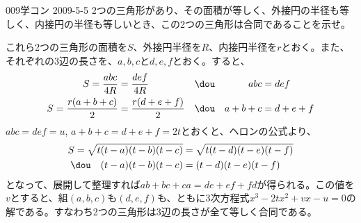 \begin{thm}{009}{}{学コン 2009-5-5}
 2つの三角形があり、その面積が等しく、外接円の半径も等しく、内接円の半径も等しいとき、この2つの三角形は合同であることを示せ。
\end{thm}

これら2つの三角形の面積を$S$、外接円半径を$R$、内接円半径を$r$とおく。また、それぞれの3辺の長さを、$a, b, c$と$d, e, f$とおく。すると、
\begin{align*}
 S=\frac{abc}{4R}&=\frac{def}{4R} & &\dou & abc&=def \\
 S=\frac{r(a+b+c)}{2}&=\frac{r(d+e+f)}{2} & &\dou & a+b+c&=d+e+f
\end{align*}
$abc=def=u$, $a+b+c=d+e+f=2t$とおくと、ヘロンの公式より、
\begin{align*}
 S=\sqrt{t(t-a)(t-b)(t-c)}&=\sqrt{t(t-d)(t-e)(t-f)} \\
 \dou \quad (t-a)(t-b)(t-c)&=(t-d)(t-e)(t-f)
\end{align*}
となって、展開して整理すれば$ab+bc+ca=de+ef+fd$が得られる。この値を$v$とすると、組$(a, b, c)$も$(d, e, f)$も、ともに3次方程式$x^3-2tx^2+vx-u=0$の解である。すなわち2つの三角形は3辺の長さが全て等しく合同である。